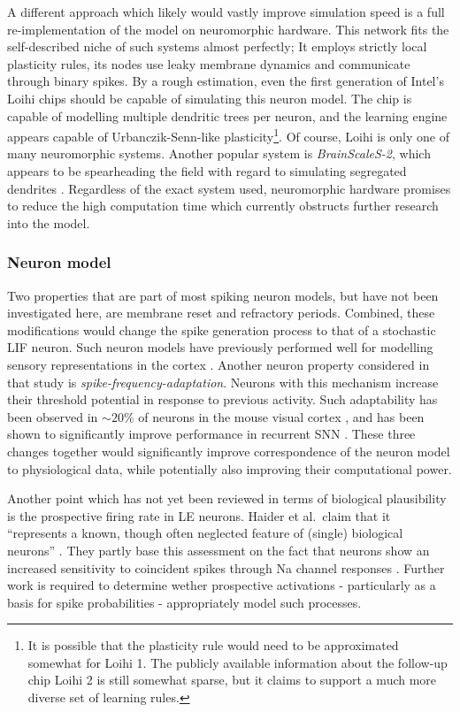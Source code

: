 A different approach which likely would vastly improve simulation speed is a full re-implementation of the model on
neuromorphic hardware. This network fits the self-described niche of such systems almost perfectly; It employs strictly
local plasticity rules, its nodes use leaky membrane dynamics and communicate through binary spikes. By a rough
estimation, even the first generation of Intel's Loihi chips \citep{davies2018loihi} should be capable of simulating
this neuron model. The chip is capable of modelling multiple dendritic trees per neuron, and the learning engine appears
capable of Urbanczik-Senn-like plasticity\footnote{It is possible that the plasticity rule would need to be approximated
somewhat for Loihi 1. The publicly available information about the follow-up chip Loihi 2 \citep{Davies2021} is still
somewhat sparse, but it claims to support a much more diverse set of learning rules.}. Of course, Loihi is only one of
many neuromorphic systems. Another popular system is \textit{BrainScaleS-2}, which appears to be spearheading the field
with regard to simulating segregated dendrites \citep{Kaiser2022}. Regardless of the exact system used, neuromorphic
hardware promises to reduce the high computation time which currently obstructs further research into the model.


\subsubsection*{Neuron model}

Two properties that are part of most spiking neuron models, but have not been investigated here, are membrane reset and
refractory periods. Combined, these modifications would change the spike generation process to that of a stochastic LIF
neuron. Such neuron models have previously performed well for modelling sensory representations in the cortex
\citep{Pillow2008}. Another neuron property considered in that study is \textit{spike-frequency-adaptation}. Neurons
with this mechanism increase their threshold potential in response to previous activity. Such adaptability has been
observed in $\sim 20 \% $ of neurons in the mouse visual cortex \citep{allen2018}, and has been shown to significantly
improve performance in recurrent SNN \citep{bellec2018long,bellec2020solution}. These three changes together would
significantly improve correspondence of the neuron model to physiological data, while potentially also improving their
computational power.

Another point which has not yet been reviewed in terms of biological plausibility is the prospective firing rate in LE
neurons. Haider et al.\ claim that it ``represents a known, though often neglected feature of (single) biological
neurons'' \citep{Haider2021}. They partly base this assessment on the fact that neurons show an increased sensitivity to
coincident spikes through Na channel responses \citep{Platkiewicz2011}. Further work is required to determine wether
prospective activations - particularly as a basis for spike probabilities - appropriately model such processes.  

